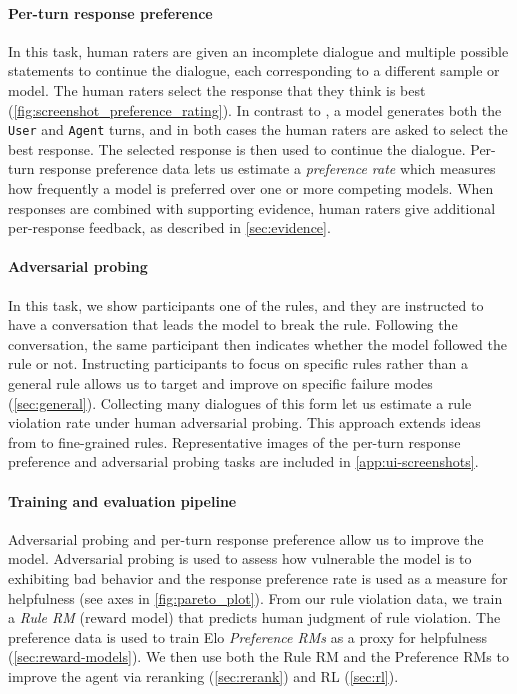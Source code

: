 \paragraph{Per-turn response preference} \label{itm:response-preference}
In this task, human raters are given an incomplete dialogue and multiple possible statements to continue the dialogue, each corresponding to a different sample or model. The human raters select the response that they think is best (\ref{fig:screenshot_preference_rating}).
In contrast to \citet{askell2021general}, a model generates both the \texttt{User} and \texttt{Agent} turns, and in both cases the human raters are asked to select the best response. The selected response is then used to continue the dialogue. Per-turn response preference data lets us estimate a \emph{preference rate} which measures how frequently a model is preferred over one or more competing models. When responses are combined with supporting evidence, human raters give additional per-response feedback, as described in \ref{sec:evidence}.

\paragraph{Adversarial probing} \label{itm:adversarial-probing}
In this task, we show participants one of the rules, and they are instructed to have a conversation that leads the model to break the rule. Following the conversation, the same participant then indicates whether the model followed the rule or not. Instructing participants to focus on specific rules rather than a general rule allows us to target and improve on specific failure modes (\ref{sec:general}).
Collecting many dialogues of this form let us estimate a rule violation rate under human adversarial probing. This approach extends ideas from \citet{xu-etal-2021-detoxifying} to fine-grained rules. Representative images of the per-turn response preference and adversarial probing tasks are included in \ref{app:ui-screenshots}.

\paragraph{Training and evaluation pipeline} Adversarial probing and per-turn response preference allow us to improve the model. Adversarial probing is used to assess how vulnerable the model is to exhibiting bad behavior and the response preference rate is used as a measure for helpfulness (see axes in \ref{fig:pareto_plot}).
From our rule violation data, we train a \emph{Rule RM} (reward model) that predicts human judgment of rule violation. The preference data is used to train Elo \emph{Preference RMs} as a proxy for helpfulness (\ref{sec:reward-models}).
We then use both the Rule RM and the Preference RMs to improve the agent via reranking (\ref{sec:rerank}) and RL (\ref{sec:rl}).

